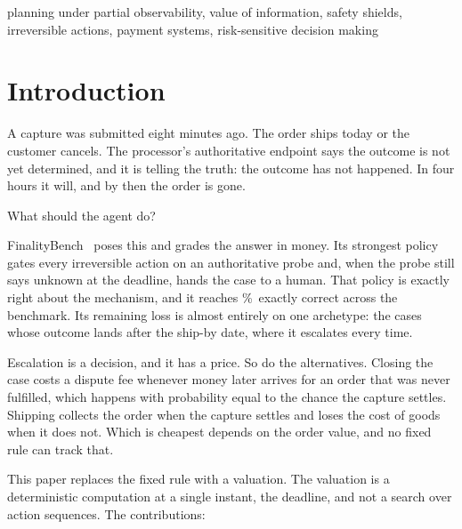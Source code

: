 \documentclass[conference]{IEEEtran}
\begin{document}
\begin{IEEEkeywords}
planning under partial observability, value of information, safety shields,
irreversible actions, payment systems, risk-sensitive decision making
\end{IEEEkeywords}

\section{Introduction}

A capture was submitted eight minutes ago. The order ships today or the customer
cancels. The processor's authoritative endpoint says the outcome is not yet
determined, and it is telling the truth: the outcome has not happened. In four
hours it will, and by then the order is gone.

What should the agent do?

FinalityBench~\cite{finalitybench} poses this and grades the answer in money.
Its strongest policy gates every irreversible action on an authoritative probe
and, when the probe still says unknown at the deadline, hands the case to a
human. That policy is exactly right about the mechanism, and it reaches
\gateExact\%\ exactly correct across the benchmark. Its remaining loss is almost
entirely on one archetype: the cases whose outcome lands after the ship-by date,
where it escalates every time.

Escalation is a decision, and it has a price. So do the alternatives. Closing
the case costs a dispute fee whenever money later arrives for an order that was
never fulfilled, which happens with probability equal to the chance the capture
settles. Shipping collects the order when the capture settles and loses the cost
of goods when it does not. Which is cheapest depends on the order value, and no
fixed rule can track that.

This paper replaces the fixed rule with a valuation. The valuation is a
deterministic computation at a single instant, the deadline, and not a search
over action sequences. The contributions:
\end{document}
